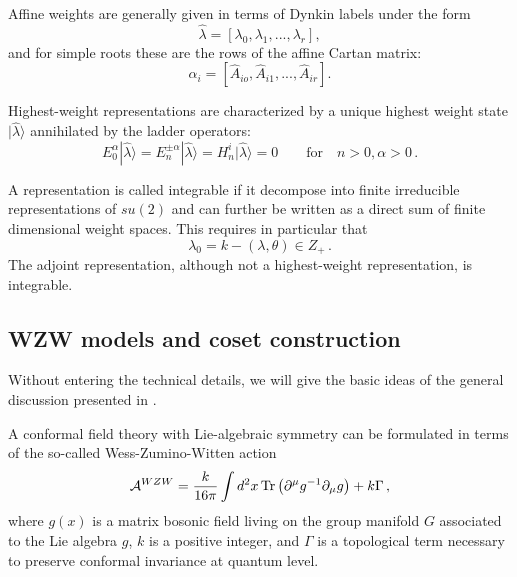 \documentclass[a4paper,12pt]{report}
\begin{document}
Affine weights are generally given in terms of Dynkin labels under the form
\begin{equation}
\hat{\lambda}=[\lambda_{0},\lambda_{1},...,\lambda_{r}],
\end{equation}
and for simple roots these are the rows of the affine Cartan matrix:
\begin{equation}
\alpha_{i}=[\widehat{A}_{io},\widehat{A}_{i1},...,\widehat{A}_{ir}].
\end{equation}

Highest-weight representations are characterized by a unique highest weight state $|\hat{\lambda}\rangle$
annihilated by the ladder operators:
\begin{equation}
E_{0}^{\alpha}|\hat{\lambda}\rangle=E_{n}^{\pm\alpha}|\hat{\lambda}\rangle=H_{n}^{i}|\hat{\lambda}\rangle=0\qquad\textrm{for}\quad
n>0,\alpha>0\,.
\end{equation}



A representation is called integrable if it decompose into finite irreducible representations of $su(2)$ and can
further be written as a direct sum of finite dimensional weight spaces. This requires in particular that
\begin{equation}
\lambda_{0}=k-(\lambda,\theta)\in Z_{+}\,.
\end{equation}
The adjoint representation, although not a highest-weight representation, is integrable.


\subsection{WZW models and coset construction}

Without entering the technical details, we will give the basic ideas of the general discussion presented in
\cite{dif}.

A conformal field theory with Lie-algebraic symmetry can be formulated in terms of the so-called
Wess-Zumino-Witten action
\begin{equation}\label{WZWaction}
{\cal A}^{WZW}=\frac{k}{16\pi}\int d^{2}x\,\textrm{Tr}\left(\partial^{\mu}g^{-1}\partial_{\mu}g\right)+k\Gamma\,,
\end{equation}
where $g(x)$ is a matrix bosonic field living on the group manifold $G$ associated to the Lie algebra $g$, $k$ is
a positive integer, and $\Gamma$ is a topological term necessary to preserve conformal invariance at quantum
level.
\end{document}
